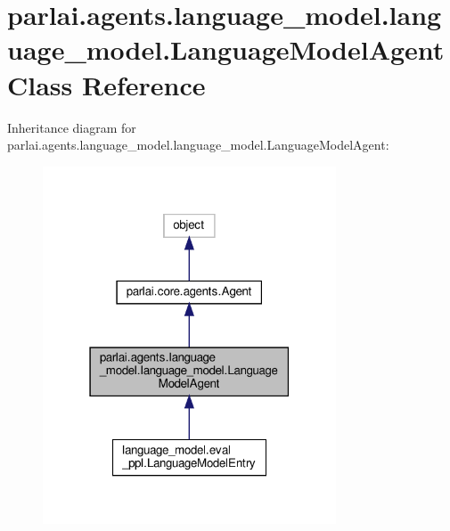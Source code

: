 \hypertarget{classparlai_1_1agents_1_1language__model_1_1language__model_1_1LanguageModelAgent}{}\section{parlai.\+agents.\+language\+\_\+model.\+language\+\_\+model.\+Language\+Model\+Agent Class Reference}
\label{classparlai_1_1agents_1_1language__model_1_1language__model_1_1LanguageModelAgent}


Inheritance diagram for parlai.\+agents.\+language\+\_\+model.\+language\+\_\+model.\+Language\+Model\+Agent\+:\nopagebreak
\begin{figure}[H]
\begin{center}
\leavevmode
\includegraphics[width=247pt]{da/d5a/classparlai_1_1agents_1_1language__model_1_1language__model_1_1LanguageModelAgent__inherit__graph}
\end{center}
\end{figure}


